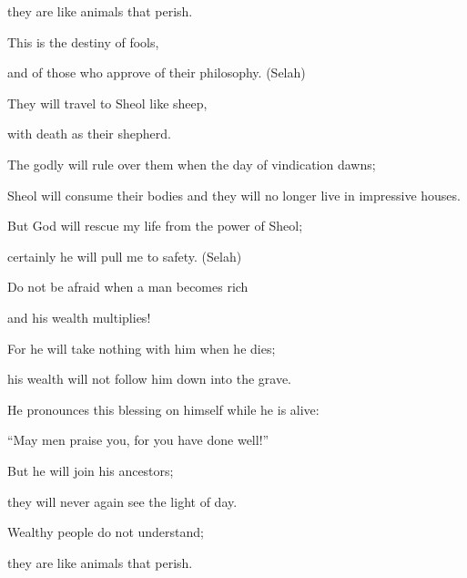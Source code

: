 {\par }{\Q they are like
animals
that perish.
\par }{\Q {}This
is the destiny
of fools,

\par }{\Q and of those who approve of their philosophy.
(Selah)
\par }{\Q {}They will travel to Sheol
like sheep,
\par }{\Q with death
as their shepherd.
\par }{\Q The godly
will rule over
them when the day of vindication dawns;
\par }{\Q Sheol
will consume their bodies
and they will no longer live
in impressive houses.
\par }{\Q {}But
God
will rescue
my life
from the power
of Sheol;
\par }{\Q certainly
he will pull
me to safety. (Selah)
\par }{\Q {}Do not
be afraid
when
a man
becomes
rich
\par }{\Q and his wealth multiplies!
\par }{\Q {}For
he will take
nothing
with him when he dies;
\par }{\Q his wealth
will not
follow
him down
into the grave.
\par }{\Q {}He pronounces this
blessing
on himself
while he is alive:
\par }{\Q “May men praise
you, for
you have done well!”
\par }{\Q {}But he will join
his ancestors;
\par }{\Q they will never
again see
the light of day.
\par }{\Q {}Wealthy
people
do not
understand;
\par }{\Q they are like
animals
that perish.


\par }
